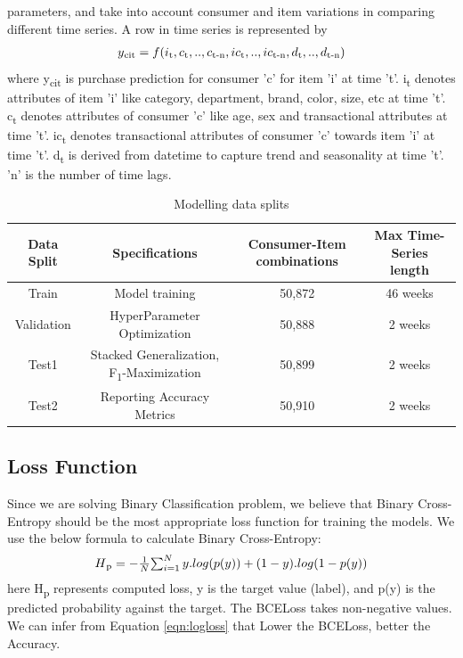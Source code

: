 parameters, and take into account consumer and item variations in comparing different time series. A row 
in time series is represented by
  \begin{equation}
    \begin{array}{l}
      y\textsubscript{cit}  = f(i\textsubscript{t}, c\textsubscript{t},..,c\textsubscript{t-n}, ic\textsubscript{t}
      ,..,ic\textsubscript{t-n}, d\textsubscript{t},..,d\textsubscript{t-n})
    \end{array}
    \label{eqn:fx}
  \end{equation}
where y\textsubscript{cit} is purchase prediction for consumer 'c' for item ’i’ at time ’t’. 
i\textsubscript{t} denotes attributes of item ’i’ like category, department, brand, color, size, etc at time 't'. 
c\textsubscript{t} denotes attributes of consumer 'c' like age, sex and transactional attributes at time 't'. 
ic\textsubscript{t} denotes transactional attributes of consumer 'c'  towards item 'i' at time 't'. 
d\textsubscript{t} is derived from datetime to capture trend and seasonality at time 't'. 
'n' is the number of time lags.
\begin{table}[t]
\caption{Modelling data splits}
\vspace{0.1 in}
\centering
\resizebox{3.3in}{!}
{%
\begin{tabular}{|c|c|c|c|}
\hline
{\bf Data Split} & {\bf Specifications} & {\bf Consumer-Item combinations} & {\bf Max Time-Series length} \\  
\hline\hline
Train  		&  Model training &  50,872 &  46 weeks \\ \hline
Validation	  		&  HyperParameter Optimization &  50,888 &  2 weeks \\ \hline
Test1  		&  Stacked Generalization, F\textsubscript{1}-Maximization & 50,899 &  2 weeks\\ \hline
Test2	  		&  Reporting Accuracy Metrics & 50,910 &  2 weeks\\
\hline
\end{tabular}
}
\label{tab:datasplit}
\end{table}
\subsection{Loss Function}
Since we are solving Binary Classification problem, we believe that Binary Cross-Entropy should be the most appropriate 
loss function for training the models. We use the below formula to calculate Binary Cross-Entropy:
  \begin{equation}
      \begin{array}{l}
        H\textsubscript{p} = - \frac{1}{N}$$\sum_{i=1}^{N}y.log(p(y))+
        (1- y).log(1-p(y))
      \end{array}
    \label{eqn:logloss}
  \end{equation}
here H\textsubscript{p} represents computed loss, y is the target value (label), and p(y) 
is the predicted probability against the target. The BCELoss takes non-negative values. We can infer 
from Equation \ref{eqn:logloss} that Lower the BCELoss, better the Accuracy.

